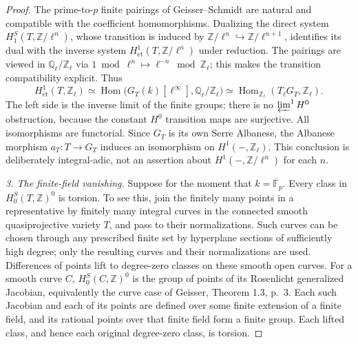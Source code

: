 \begin{proof}
The prime-to-$p$ finite pairings of Geisser--Schmidt are
natural and compatible with the coefficient homomorphisms.
Dualizing the direct system
$H_1^S(T,\mathbb Z/\ell^n)$, whose transition is induced by
$\mathbb Z/\ell^n\hookrightarrow\mathbb Z/\ell^{n+1}$,
identifies its dual with the inverse system
$H^1_{\mathrm{et}}(T,\mathbb Z/\ell^n)$ under reduction.
The pairings are viewed in $\mathbb Q_\ell/\mathbb Z_\ell$
via $1\bmod\ell^n\mapsto\ell^{-n}\bmod\mathbb Z_\ell$;
this makes the transition compatibility explicit. Thus
\[
 H^1_{\mathrm{et}}(T,\mathbb Z_\ell)
  \simeq\operatorname{Hom}\bigl(
       G_T(k)[\ell^\infty],\mathbb Q_\ell/\mathbb Z_\ell\bigr)
  \simeq\operatorname{Hom}_{\mathbb Z_\ell}
       (T_\ell G_T,\mathbb Z_\ell).                         \tag{AQ.14.6}
\]
The left side is the inverse limit of the finite groups;
there is no $\varprojlim^1 H^0$ obstruction, because the
constant $H^0$ transition maps are surjective. All
isomorphisms are functorial. Since $G_T$ is its own Serre
Albanese, the Albanese morphism $a_T:T\to G_T$ induces an
isomorphism on $H^1(-,\mathbb Z_\ell)$. This conclusion
is deliberately integral-adic, not an assertion about
$H^1(-,\mathbb Z/\ell^n)$ for each $n$.

\emph{3. The finite-field vanishing.}
Suppose for the moment that $k=\overline{\mathbb F}_p$.
Every class in $H_0^S(T,\mathbb Z)^0$ is torsion.
To see this, join the finitely many points in a representative
by finitely many integral curves in the connected smooth
quasiprojective variety $T$, and pass to their normalizations.
Such curves can be chosen through any prescribed finite
set by hyperplane sections of sufficiently high degree;
only the resulting curves and their normalizations are
used. Differences of points lift to degree-zero classes
on these smooth open curves. For a smooth curve $C$,
$H_0^S(C,\mathbb Z)^0$ is the group of points of its
Rosenlicht generalized Jacobian, equivalently the curve
case of Geisser, Theorem 1.3, p.~3. Each such Jacobian and
each of its points are defined over some finite extension
of a finite field, and its rational points over that
finite field form a finite group. Each lifted class,
and hence each original degree-zero class, is torsion.


\end{proof}
